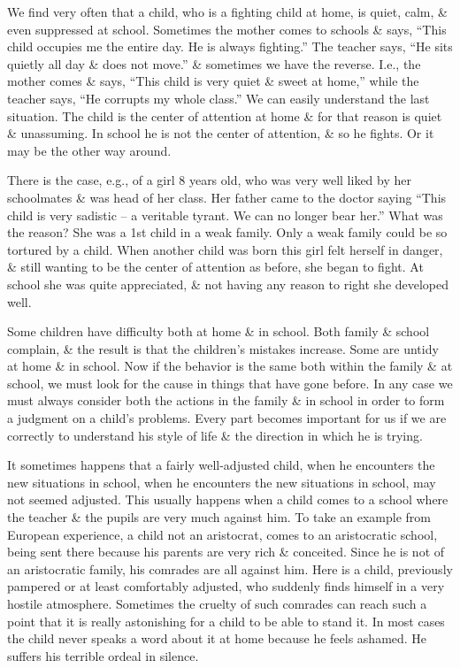 \documentclass{article}
\numberwithin{equation}{section}
\begin{document}
We find very often that a child, who is a fighting child at home, is quiet, calm, \& even suppressed at school. Sometimes the mother comes to schools \& says, ``This child occupies me the entire day. He is always fighting.'' The teacher says, ``He sits quietly all day \& does not move.'' \& sometimes we have the reverse. I.e., the mother comes \& says, ``This child is very quiet \& sweet at home,'' while the teacher says, ``He corrupts my whole class.'' We can easily understand the last situation. The child is the center of attention at home \& for that reason is quiet \& unassuming. In school he is not the center of attention, \& so he fights. Or it may be the other way around.

There is the case, e.g., of a girl 8 years old, who was very well liked by her schoolmates \& was head of her class. Her father came to the doctor saying ``This child is very sadistic -- a veritable tyrant. We can no longer bear her.'' What was the reason? She was a 1st child in a weak family. Only a weak family could be so tortured by a child. When another child was born this girl felt herself in danger, \& still wanting to be the center of attention as before, she began to fight. At school she was quite appreciated, \& not having any reason to right she developed well.

Some children have difficulty both at home \& in school. Both family \& school complain, \& the result is that the children's mistakes increase. Some are untidy at home \& in school. Now if the behavior is the same both within the family \& at school, we must look for the cause in things that have gone before. In any case we must always consider both the actions in the family \& in school in order to form a judgment on a child's problems. Every part becomes important for us if we are correctly to understand his style of life \& the direction in which he is trying.

It sometimes happens that a fairly well-adjusted child, when he encounters the new situations in school, when he encounters the new situations in school, may not seemed adjusted. This usually happens when a child comes to a school where the teacher \& the pupils are very much against him. To take an example from European experience, a child not an aristocrat, comes to an aristocratic school, being sent there because his parents are very rich \& conceited. Since he is not of an aristocratic family, his comrades are all against him. Here is a child, previously pampered or at least comfortably adjusted, who suddenly finds himself in a very hostile atmosphere. Sometimes the cruelty of such comrades can reach such a point that it is really astonishing for a child to be able to stand it. In most cases the child never speaks a word about it at home because he feels ashamed. He suffers his terrible ordeal in silence.
\end{document}
